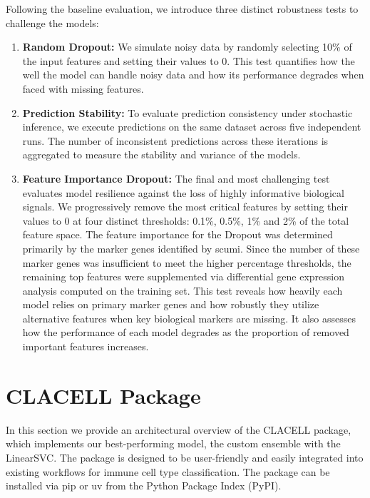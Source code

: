 \documentclass[11pt]{article}
\begin{document}

Following the baseline evaluation, we introduce three distinct robustness tests to challenge the models:

\begin{enumerate}
    \item \textbf{Random Dropout:} We simulate noisy data by randomly selecting 10\% of the input features and setting their values to 0. This test quantifies how the well the model can handle noisy data and how its performance degrades when faced with missing features.
    \item \textbf{Prediction Stability:} To evaluate prediction consistency under stochastic inference, we execute predictions on the same dataset across five independent runs. The number of inconsistent predictions across these iterations is aggregated to measure the stability and variance of the models.
    \item \textbf{Feature Importance Dropout:} The final and most challenging test evaluates model resilience against the loss of highly informative biological signals. We progressively remove the most critical features by setting their values to 0 at four distinct thresholds: 0.1\%, 0.5\%, 1\% and 2\% of the total feature space. The feature importance for the Dropout was determined primarily by the marker genes identified by scumi. Since the number of these marker genes was insufficient to meet the higher percentage thresholds, the remaining top features were supplemented via differential gene expression analysis computed on the training set. This test reveals how heavily each model relies on primary marker genes and how robustly they utilize alternative features when key biological markers are missing. It also assesses how the performance of each model degrades as the proportion of removed important features increases.
\end{enumerate}



\section{CLACELL Package}\label{sec:package}

In this section we provide an architectural overview of the CLACELL package, which implements our best-performing model, the custom ensemble with the LinearSVC. The package is designed to be user-friendly and easily integrated into existing workflows for immune cell type classification. %
The package can be installed via pip or uv from the Python Package Index (PyPI).
\end{document}
